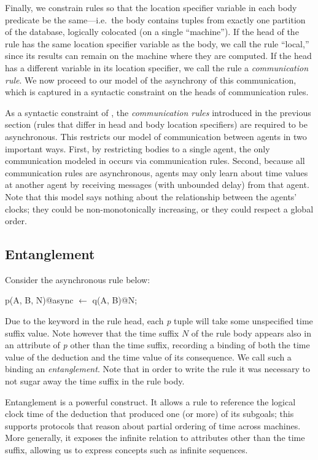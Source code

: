 Finally, we constrain \lang rules so that the location specifier variable in each body predicate be the same---i.e.\ the body contains tuples from exactly one partition of the database, logically colocated (on a single ``machine'').  If the head of the rule has the same location specifier variable as the body, we call the rule ``local,'' since its results can remain on the machine where they are computed.  If the head has a different variable in its location specifier, we call the rule a {\em communication rule}.  We now proceed to our model of the asynchrony of this communication, which is captured in a syntactic constraint on the heads of communication rules.

As a syntactic constraint of \lang, the {\em communication rules} introduced in the previous section (rules that differ in head and body location specifiers) are required to be asynchronous.
This restricts our model of communication between agents in two important ways.
First, by restricting bodies to a single agent, the only communication
modeled in \lang occurs via communication rules.  Second, because
all communication rules are asynchronous, agents may only learn about
time values at another agent by receiving messages (with unbounded
delay) from that agent.  Note that this model says nothing about the
relationship between the agents' clocks; they could be
non-monotonically increasing, or they could respect a global order.

\subsection{Entanglement}
\label{sec:entangle}
Consider the asynchronous rule below:

\begin{Dedalus}
p(A, B, N)@async \(\leftarrow\)
  q(A, B)@N;
\end{Dedalus}
\noindent
Due to the  keyword in the rule head, each \emph{p} tuple will take some unspecified time suffix value.
Note however that the time suffix $N$ of the rule body appears also in an attribute of \emph{p} other than the time suffix, recording a 
binding of both the time value of the deduction and the time value of its consequence.  We call such a binding
an \emph{entanglement}.   Note that in order
to write the rule it was necessary to not sugar away the time suffix in the rule body.  

Entanglement is a powerful construct.  It allows a rule
to reference the logical clock time of the deduction that produced one
(or more) of its subgoals; this supports protocols that reason about partial ordering of time across machines.  More generally, it exposes the infinite  relation to attributes other than the time suffix, allowing us to express concepts such as infinite sequences.



